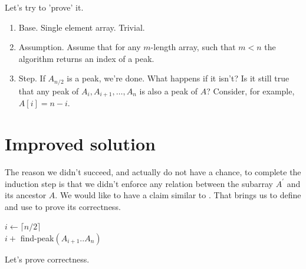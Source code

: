 Let's try to 'prove' it.  
\begin{enumerate}
 \item Base. Single element array. Trivial. 
  \item Assumption. Assume that for any $m$-length array, such that $m<n$ the algorithm returns an index of a peak. 
  \item Step. If $A_{n/2}$ is a peak, we're done. What happens if it isn't? Is it still true that any peak of $A_{i},A_{i+1}, \ldots, A_{n}$ is also a peak of $A$? Consider, for example, $A[i] = n - i$.
\end{enumerate}

\section{Improved solution}
The reason we didn't succeed, and actually do not have a chance, to complete the induction step is that we didn't enforce any relation between the subarray $A^{\prime}$ and its ancestor $A$. We would like to have a claim similar to . That brings us to define  and use  to prove its correctness.
\begin{algorithm}
\caption{improved algorithm}
$ i \leftarrow  \lceil n/2 \rceil $\\
         { 
          \Return $i + $ find-peak$\left(A_{i+1}..A_{n}\right)$
        }
        \label{alg:workreq}
\end{algorithm}
Let's prove correctness.
